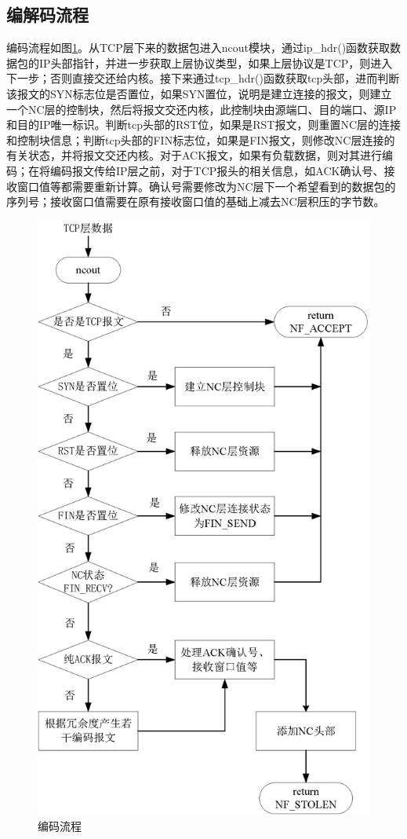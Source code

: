\subsection{编解码流程}
编码流程如图\ref{BIANMALC_EPS}。从TCP层下来的数据包进入ncout模块，通过ip\_hdr()函数获取数据包的IP头部指针，并进一步获取上层协议类型，如果上层协议是TCP，则进入下一步；否则直接交还给内核。接下来通过tcp\_hdr()函数获取tcp头部，进而判断该报文的SYN标志位是否置位，如果SYN置位，说明是建立连接的报文，则建立一个NC层的控制块，然后将报文交还内核，此控制块由源端口、目的端口、源IP和目的IP唯一标识。判断tcp头部的RST位，如果是RST报文，则重置NC层的连接和控制块信息；判断tcp头部的FIN标志位，如果是FIN报文，则修改NC层连接的有关状态，并将报文交还内核。对于ACK报文，如果有负载数据，则对其进行编码；在将编码报文传给IP层之前，对于TCP报头的相关信息，如ACK确认号、接收窗口值等都需要重新计算。确认号需要修改为NC层下一个希望看到的数据包的序列号；接收窗口值需要在原有接收窗口值的基础上减去NC层积压的字节数。
\begin{figure}[htbp] 
	\centering
	\includegraphics[width=5in]{figures/encodelc.eps}
	\caption{编码流程}
	\label{BIANMALC_EPS}
\end{figure}
